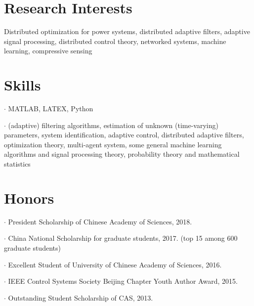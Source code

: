 \documentclass[letterpaper]{article}
\renewenvironment{itemize}{
  \begin{list}{}{
    \setlength{\leftmargin}{1em}
  }
}{
  \end{list}
}
\begin{document}
\section*{Research Interests}


Distributed optimization for power systems, distributed adaptive filters, adaptive signal processing, distributed control theory, networked systems, machine learning, compressive sensing


\section*{Skills}
\begin{itemize}
\item $\bm{\cdot}$ MATLAB, LATEX, Python
\item $\bm{\cdot}$ (adaptive) filtering algorithms, estimation of unknown (time-varying) parameters, system identification, adaptive control, distributed adaptive filters, optimization theory, multi-agent system, some general machine learning algorithms and signal processing theory, probability theory and mathematical statistics
\end{itemize}


\section*{Honors}
\begin{itemize}
\item $\bm{\cdot}$ President Scholarship of Chinese Academy of Sciences, 2018.
\item $\bm{\cdot}$ China National Scholarship for graduate students, 2017. (top 15 among 600 graduate students)
\item $\bm{\cdot}$ Excellent Student of University of Chinese Academy of Sciences, 2016.
\item $\bm{\cdot}$ IEEE Control Systems Society Beijing Chapter Youth Author Award, 2015.
\item $\bm{\cdot}$ Outstanding Student Scholarship of CAS, 2013.
\end{itemize}
\end{document}
